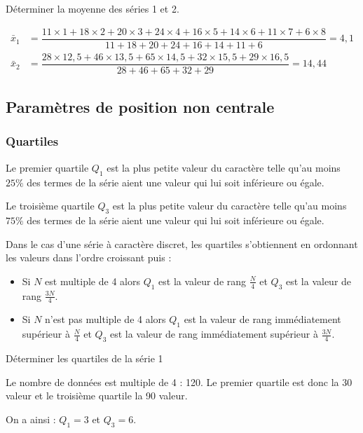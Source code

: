 \documentclass[french]{book}
\begin{document}
\begin{exemple}
D\'eterminer la moyenne des s\'eries 1 et 2.
\end{exemple}


\begin{align*}
\bar{x}_1&=\dfrac{11\times1+18\times2+20\times3+24\times4+16\times5+14\times6+11\times7+6\times8}{11+18+20+24+16+14+11+6}=4,1\\
\bar{x}_2&=\dfrac{28\times12,5+46\times13,5+65\times14,5+32\times15,5+29\times16,5}{28+46+65+32+29}=14,44
\end{align*}


\subsection{Param\`etres de position non centrale}
\subsubsection*{Quartiles}
\begin{defn}
Le premier quartile $Q_{1}$ est la plus petite valeur du caract\`ere telle qu'au moins $25\%$ des termes de la s\'erie aient une valeur qui lui soit inf\'erieure ou \'egale.

Le troisi\`eme quartile $Q_{3}$ est la plus petite valeur du caract\`ere telle qu'au moins $75\%$ des termes de la s\'erie aient une valeur qui lui soit inf\'erieure ou \'egale.
\end{defn}

Dans le cas d'une s\'erie à caract\`ere discret, les quartiles s'obtiennent en ordonnant les valeurs dans l'ordre croissant puis :
\begin{itemize}
\item Si $N$ est multiple de 4 alors $Q_1$ est la valeur de rang $\frac{N}{4}$ et $Q_3$ est la valeur de rang $\frac{3N}{4}$.
\item Si $N$ n'est pas multiple de 4 alors $Q_1$ est la valeur de rang imm\'ediatement sup\'erieur à $\frac{N}{4}$ et $Q_3$ est la valeur de rang imm\'ediatement sup\'erieur à $\frac{3N}{4}$.
\end{itemize}
\begin{exemple}
D\'eterminer les quartiles de la s\'erie 1
\end{exemple}


Le nombre de donn\'ees est multiple de 4 : 120. Le premier quartile est donc la 30 valeur et le troisi\`eme quartile la 90 valeur.
\par On a ainsi : $Q_1=3$ et $Q_3=6$.
\end{document}
